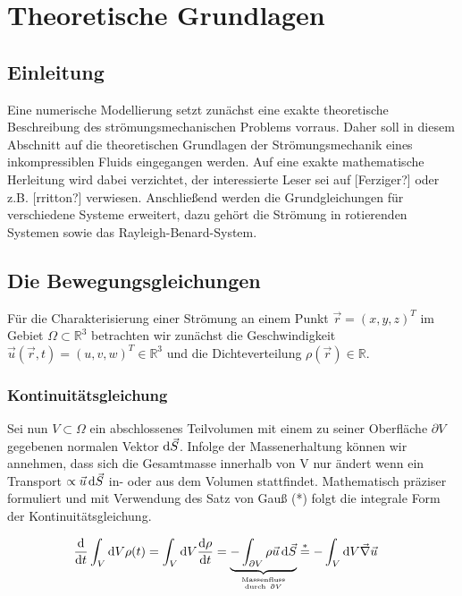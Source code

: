 \chapter{Theoretische Grundlagen}

\section{Einleitung}

Eine numerische Modellierung setzt zunächst eine exakte theoretische Beschreibung des strömungsmechanischen Problems vorraus.
Daher soll in diesem Abschnitt auf die theoretischen Grundlagen der Strömungsmechanik eines inkompressiblen Fluids eingegangen werden.
Auf eine exakte mathematische Herleitung wird dabei verzichtet, der interessierte Leser sei auf [Ferziger?] oder z.B. [rritton?] verwiesen.
Anschließend werden die Grundgleichungen für verschiedene Systeme erweitert, dazu gehört die Strömung in rotierenden Systemen sowie das Rayleigh-Benard-System.

\section{Die Bewegungsgleichungen}

Für die Charakterisierung einer Strömung an einem Punkt $\vec{r} = (x, y, z)^T$  im Gebiet $\Omega \subset \mathbb{R}^3$ betrachten wir zunächst
die Geschwindigkeit $\vec{u}(\vec{r}, t) = (u, v, w)^T \in \mathbb{R}^3$ und die Dichteverteilung $\rho(\vec{r}) \in \mathbb{R}$.

\subsection{Kontinuitätsgleichung}

Sei nun $V \subset \Omega$  ein abschlossenes Teilvolumen mit einem zu seiner Oberfläche $\partial V$ gegebenen normalen Vektor $\mathop{}\!\mathrm{d} \vec{S}$.
Infolge der Massenerhaltung können wir annehmen, dass sich die Gesamtmasse innerhalb von V nur ändert wenn ein
Transport $\propto \vec{u}\mathop{}\!\mathrm{d} \vec{S}$ in- oder aus dem Volumen stattfindet.
Mathematisch präziser formuliert und mit Verwendung des Satz von Gauß (*) folgt die integrale Form der Kontinuitätsgleichung.

\begin{align}
    \frac{\dif}{\dif t} \int_{V}\dif V \rho(t) =  \int_{V}\dif V \frac{\dif \rho}{\dif t}  &= \underbrace{-\int_{\partial V}
     \rho \vec{u}\dif \vec{S}}_{\mathrm{Massenfluss} \atop \mathrm{durch \ } \partial V} \overset{*}{=} -\int_V \dif V \vec{\nabla}\vec{u}
\end{align}

